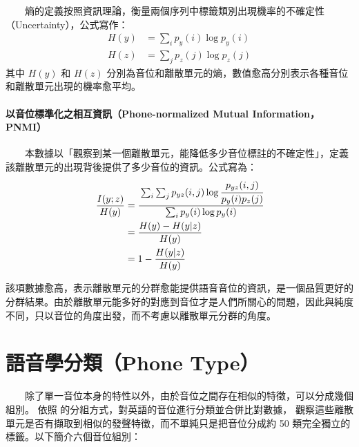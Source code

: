 　　熵的定義按照資訊理論，衡量兩個序列中標籤類別出現機率的不確定性（Uncertainty），公式寫作：
    \begin{align}
        H(y) &= \sum_i{p_y(i)\log p_y(i)} \\
        H(z) &= \sum_j{p_z(j)\log p_z(j)}
    \end{align}
其中 $H(y)$ 和 $H(z)$ 分別為音位和離散單元的熵，數值愈高分別表示各種音位和離散單元出現的機率愈平均。

\paragraph{以音位標準化之相互資訊（Phone-normalized Mutual Information，PNMI）}

　　本數據以「觀察到某一個離散單元，能降低多少音位標註的不確定性」，定義該離散單元的出現背後提供了多少音位的資訊。公式寫為：
    \begin{align}
        \frac{I(y;z)}{H(y)}&=\cfrac{\sum_i \sum_j p_{yz}(i, j) \log \cfrac{p_{yz}(i, j)}{p_y(i)p_z(j)}}{\sum_i p_y(i) \log p_y(i)} \\
        &=\frac{H(y)-H(y|z)}{H(y)} \\
        &=1-\frac{H(y|z)}{H(y)}
    \end{align}

        該項數據愈高，表示離散單元的分群愈能提供語音音位的資訊，是一個品質更好的分群結果。由於離散單元能多好的對應到音位才是人們所關心的問題，因此與純度不同，只以音位的角度出發，而不考慮以離散單元分群的角度。

% 

\section{語音學分類（Phone Type）}


　　除了單一音位本身的特性以外，由於音位之間存在相似的特徵，可以分成幾個組別。
依照 \cite{10097097, abdullah23_interspeech} 的分組方式，對英語的音位進行分類並合併比對數據，
觀察這些離散單元是否有擷取到相似的發聲特徵，而不單純只是把音位分成約 50 類完全獨立的標籤。以下簡介六個音位組別：



